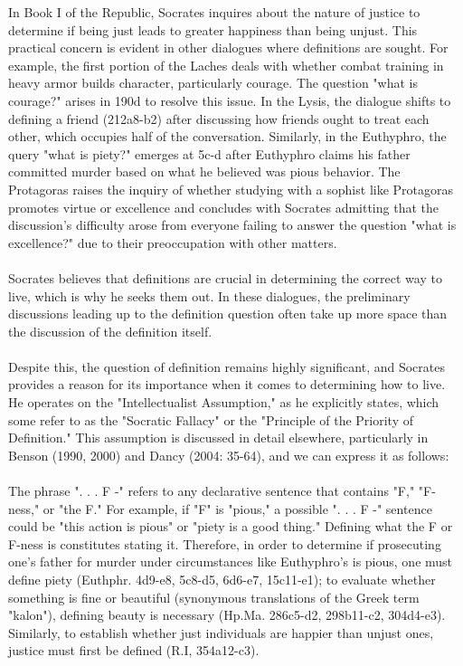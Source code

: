 In Book I of the Republic, Socrates inquires about the nature of justice to determine if being just leads to greater happiness than being unjust. This practical concern is evident in other dialogues where definitions are sought. For example, the first portion of the Laches deals with whether combat training in heavy armor builds character, particularly courage. The question "what is courage?" arises in 190d to resolve this issue. In the Lysis, the dialogue shifts to defining a friend (212a8-b2) after discussing how friends ought to treat each other, which occupies half of the conversation. Similarly, in the Euthyphro, the query "what is piety?" emerges at 5c-d after Euthyphro claims his father committed murder based on what he believed was pious behavior. The Protagoras raises the inquiry of whether studying with a sophist like Protagoras promotes virtue or excellence and concludes with Socrates admitting that the discussion's difficulty arose from everyone failing to answer the question "what is excellence?" due to their preoccupation with other matters.
\\
\\
Socrates believes that definitions are crucial in determining the correct way to live, which is why he seeks them out. In these dialogues, the preliminary discussions leading up to the definition question often take up more space than the discussion of the definition itself.
\\
\\
Despite this, the question of definition remains highly significant, and Socrates provides a reason for its importance when it comes to determining how to live. He operates on the "Intellectualist Assumption," as he explicitly states, which some refer to as the "Socratic Fallacy" or the "Principle of the Priority of Definition." This assumption is discussed in detail elsewhere, particularly in Benson (1990, 2000) and Dancy (2004: 35-64), and we can express it as follows:
\\
\\
The phrase ". . . F -" refers to any declarative sentence that contains "F," "F-ness," or "the F." For example, if "F" is "pious," a possible ". . . F -" sentence could be "this action is pious" or "piety is a good thing." Defining what the F or F-ness is constitutes stating it. Therefore, in order to determine if prosecuting one's father for murder under circumstances like Euthyphro's is pious, one must define piety (Euthphr. 4d9-e8, 5c8-d5, 6d6-e7, 15c11-e1); to evaluate whether something is fine or beautiful (synonymous translations of the Greek term "kalon"), defining beauty is necessary (Hp.Ma. 286c5-d2, 298b11-c2, 304d4-e3). Similarly, to establish whether just individuals are happier than unjust ones, justice must first be defined (R.I, 354a12-c3).
